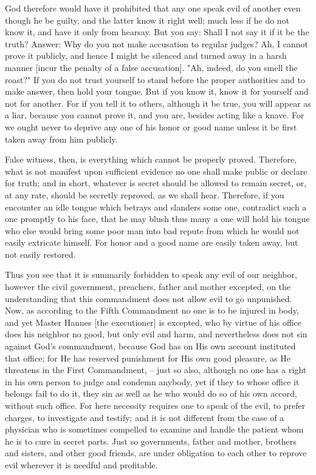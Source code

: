 God therefore would have it prohibited that any one speak evil of
another even though he be guilty, and the latter know it right well;
much less if he do not know it, and have it only from hearsay. But you
say: Shall I not say it if it be the truth? Answer: Why do you not make
accusation to regular judges? Ah, I cannot prove it publicly, and hence
I might be silenced and turned away in a harsh manner [incur the
penalty of a false accusation]. "Ah, indeed, do you smell the roast?"
If you do not trust yourself to stand before the proper authorities and
to make answer, then hold your tongue. But if you know it, know it for
yourself and not for another. For if you tell it to others, although it
be true, you will appear as a liar, because you cannot prove it, and
you are, besides acting like a knave. For we ought never to deprive any
one of his honor or good name unless it be first taken away from him
publicly.

False witness, then, is everything which cannot be properly proved.
Therefore, what is not manifest upon sufficient evidence no one shall
make public or declare for truth; and in short, whatever is secret
should be allowed to remain secret, or, at any rate, should be secretly
reproved, as we shall hear. Therefore, if you encounter an idle tongue
which betrays and slanders some one, contradict such a one promptly to
his face, that he may blush thus many a one will hold his tongue who
else would bring some poor man into bad repute from which he would not
easily extricate himself. For honor and a good name are easily taken
away, but not easily restored.

Thus you see that it is summarily forbidden to speak any evil of our
neighbor, however the civil government, preachers, father and mother
excepted, on the understanding that this commandment does not allow
evil to go unpunished. Now, as according to the Fifth Commandment no
one is to be injured in body, and yet Master Hannes [the executioner]
is excepted, who by virtue of his office does his neighbor no good, but
only evil and harm, and nevertheless does not sin against God's
commandment, because God has on His own account instituted that office;
for He has reserved punishment for His own good pleasure, as He
threatens in the First Commandment, -- just so also, although no one
has a right in his own person to judge and condemn anybody, yet if they
to whose office it belongs fail to do it, they sin as well as he who
would do so of his own accord, without such office. For here necessity
requires one to speak of the evil, to prefer charges, to investigate
and testify; and it is not different from the case of a physician who
is sometimes compelled to examine and handle the patient whom he is to
cure in secret parts. Just so governments, father and mother, brothers
and sisters, and other good friends, are under obligation to each other
to reprove evil wherever it is needful and profitable.

